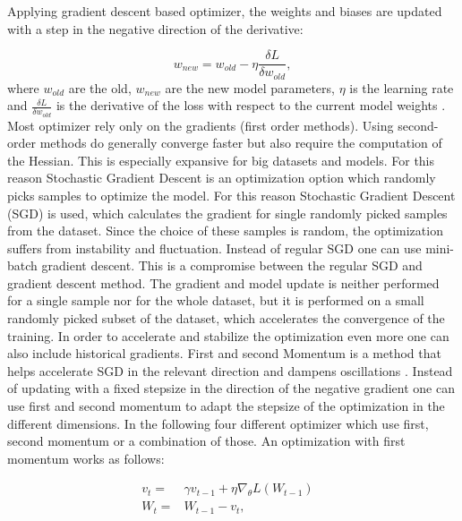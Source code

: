 Applying gradient descent based optimizer, the weights and biases are updated with a step in the negative direction of the derivative:

\begin{equation}
  w_{new} = w_{old} - \eta \frac{\delta L}{\delta w_{old}},
\end{equation}
where $w_{old}$ are the old, $w_{new}$ are the new model parameters, $\eta$ is the learning rate and $\frac{\delta L}{\delta w_{old}}$ is the derivative of the loss with respect to the current model weights \cite{ShilohPerl2020}. 
Most optimizer rely only on the gradients (first order methods). Using second-order methods do generally converge faster but also require the computation of the Hessian. This is especially expansive for big datasets and models. For this reason Stochastic Gradient Descent is an optimization option which randomly picks samples to optimize the model. For this reason Stochastic Gradient Descent (SGD) is used, which calculates the gradient for single randomly picked samples from the dataset. Since the choice of these samples is random, the optimization suffers from instability and fluctuation. Instead of regular SGD one can use mini-batch gradient descent. This is a compromise between the regular SGD and gradient descent method. The gradient and model update is neither performed for a single sample nor for the whole dataset, but it is performed on a small randomly picked subset of the dataset, which accelerates the convergence of the training.\newline
\newline
In order to accelerate and stabilize the optimization even more one can also include historical gradients. First and second Momentum is a method that helps accelerate SGD in the relevant direction and dampens oscillations \cite{ShilohPerl2020} . Instead of updating with a fixed stepsize in the direction of the negative gradient one can use first and second momentum to adapt the stepsize of the optimization in the different dimensions. In the following four different optimizer which use first, second momentum or a combination of those. An optimization with first momentum works as follows:

\begin{equation}
  \begin{aligned}
  v_{t} = & \gamma v_{t-1} +  \eta \nabla_{\theta}L(W_{t-1}) &\\
  W_{t} = &W_{t-1} - v_{t},
  \end{aligned}
  \label{eq:moment}
\end{equation}

